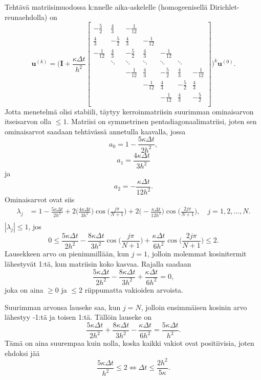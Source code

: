 \documentclass{article}
\begin{document}
Tehtävä matriisimuodossa k:nnelle aika-askelelle (homogeenisellä
Dirichlet-reunaehdolla) on
\[
  \mathbf{u}^{(k)} = \Big(\mathbf{I} + \frac{\kappa\Delta t}{h^2}
  \begin{bmatrix}
    -\frac{5}{2} & \frac{4}{3} & -\frac{1}{12} \\
    \frac{4}{3} & -\frac{5}{2} & \frac{4}{3} & -\frac{1}{12} \\
    -\frac{1}{12} & \frac{4}{3} & -\frac{5}{2} & \frac{4}{3} & -\frac{1}{12} \\
                  & \ddots & \ddots & \ddots & \ddots & \ddots \\
                  & & -\frac{1}{12} & \frac{4}{3} & -\frac{5}{2} & \frac{4}{3} & -\frac{1}{12} \\
                  & & & -\frac{1}{12} & \frac{4}{3} & -\frac{5}{2} & \frac{4}{3} \\
                  & & & & -\frac{1}{12} & \frac{4}{3} & -\frac{5}{2} \\
  \end{bmatrix}
  \Big)^k \mathbf{u}^{(0)}.
\]
Jotta menetelmä olisi stabiili, täytyy kerroinmatriisin suurimman ominaisarvon
itseisarvon olla $\leq 1$. Matriisi on symmetrinen pentadiagonaalimatriisi, joten
sen ominaisarvot saadaan tehtävässä annetulla kaavalla, jossa
\[
  a_0 = 1 - \frac{5\kappa\Delta t}{2h^2},
\]
\[
  a_1 = \frac{4\kappa\Delta t}{3h^2}
\]
ja
\[
  a_2 = -\frac{\kappa\Delta t}{12h^2}.
\]
Ominaisarvot ovat siis
\begin{align*}
  \lambda_j &= 1 - \frac{5\kappa\Delta t}{2h^2}
  + 2\Big(\frac{4\kappa\Delta t}{3h^2}\Big) \cos\Big(\frac{j\pi}{N+1}\Big)
  + 2\Big(-\frac{\kappa\Delta t}{12h^2}\Big) \cos\Big(\frac{2j\pi}{N+1}\Big),
  \quad j = 1,2,\dots,N. \\
\end{align*}
$|\lambda_j| \leq 1$, jos
\[
  0 \leq \frac{5\kappa\Delta t}{2h^2}
  - \frac{8\kappa\Delta t}{3h^2} \cos\Big(\frac{j\pi}{N+1}\Big)
  + \frac{\kappa\Delta t}{6h^2} \cos\Big(\frac{2j\pi}{N+1}\Big)
  \leq 2.
\]
Lausekkeen arvo on pienimmillään, kun $j = 1$, jolloin molemmat kosinitermit
lähestyvät 1:tä, kun matriisin koko kasvaa. Rajalla saadaan
\[
  \frac{5\kappa\Delta t}{2h^2} - \frac{8\kappa\Delta t}{3h^2} + \frac{\kappa\Delta t}{6h^2}
  = 0,
\]
joka on aina $\geq 0$ ja $\leq 2$ riippumatta vakioiden arvoista.

Suurimman arvonsa lauseke saa, kun $j = N$, jolloin ensimmäisen kosinin arvo
lähestyy -1:tä ja toisen 1:tä. Tällöin lauseke on
\[
  \frac{5\kappa\Delta t}{2h^2} + \frac{8\kappa\Delta t}{3h^2} - \frac{\kappa\Delta t}{6h^2}
  = \frac{5\kappa \Delta t}{h^2}.
\]
Tämä on aina suurempaa kuin nolla, koska kaikki vakiot ovat positiivisia, joten
ehdoksi jää
\[
  \frac{5\kappa \Delta t}{h^2} \leq 2
  \iff
  \Delta t \leq \frac{2h^2}{5\kappa}.
\]
\end{document}
